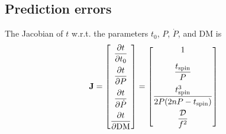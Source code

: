 \documentclass{book}
\newcommand{\pD}[2]{\dfrac{\partial {#1}}{\partial {#2}}}
\begin{document}
\subsection{Prediction errors}

The Jacobian of $t$ w.r.t. the parameters $t_0$, $P$, $\dot{P}$, and DM is
\begin{equation}
  {\bf J}
    = \begin{bmatrix}
      \pD{t}{t_0} \\[10pt]
      \pD{t}{P} \\[10pt]
      \pD{t}{\dot{P}} \\[10pt]
      \pD{t}{\rm DM}
    \end{bmatrix}
    = \begin{bmatrix}
      1 \\[10pt]
      \dfrac{\tspin}{P} \\[10pt]
      \dfrac{\tspin^3}{2P(2nP - \tspin)} \\[10pt]
      \dfrac{\mathcal{D}}{f^2}
    \end{bmatrix}
\end{equation}
\end{document}
